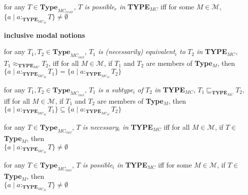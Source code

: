 \begin{shaded}
\begin{ex}
\begin{subex}
\item for any $T\in\textbf{Type}_{\mathit{MC}_{\mathit{restr}}}$, $T$ \textit{is possible$_r$ in} {\bf TYPE$_{\mathit{MC}}$}  iff for some
  $M\in\mathcal{M}$, \\ $\{a\mid a:_{\mathbf{TYPE}_{\mathit{MC}_M}}T\}\not=\emptyset$
 
\end{subex}

\end{ex}

\begin{ex}
\textbf{inclusive modal notions}
\begin{subex} 
 
\item for any $T_1,T_2\in\textbf{Type}_{\mathit{MC}_{\mathit{incl}}}$, $T_1$ \textit{is
    (necessarily) equivalent$_i$
    to} $T_2$ \textit{in} {\bf TYPE$_{\mathit{MC}}$},
  $T_1\approx_{\mathbf{TYPE_{\mathit{MC}}}}T_2$,  iff for all
  $M\in\mathcal{M}$, if $T_1$ and $T_2$ are members of
  \textbf{Type}$_M$, then $\{a\mid a:_{\mathbf{TYPE}_{\mathit{MC}_M}}T_1\}=\{a\mid a:_{\mathbf{TYPE}_{\mathit{MC}_M}}T_2\}$
  
 
\item for any $T_1,T_2\in\textbf{Type}_{\mathit{MC}_{\mathit{incl}}}$, $T_1$ \textit{is a subtype$_i$ of} $T_2$ \textit{in} {\bf TYPE$_{\mathit{MC}}$},
  $T_1\sqsubseteq_{\mathbf{TYPE_{\mathit{MC}}}}T_2$,  iff for all
  $M\in\mathcal{M}$, if $T_1$ and $T_2$ are members of
  \textbf{Type}$_M$, then $\{a\mid a:_{\mathbf{TYPE}_{\mathit{MC}_M}}T_1\}\subseteq\{a\mid a:_{\mathbf{TYPE}_{\mathit{MC}_M}}T_2\}$

\item for any $T\in\textbf{Type}_{\mathit{MC}_{\mathit{incl}}}$, $T$ \textit{is necessary$_i$ in} {\bf TYPE$_{\mathit{MC}}$}  iff for all
  $M\in\mathcal{M}$, if $T\in$\textbf{Type}$_M$, then \\ $\{a\mid a:_{\mathbf{TYPE}_{\mathit{MC}_M}}T\}\not=\emptyset$

\item for any $T\in\textbf{Type}_{\mathit{MC}_{\mathit{incl}}}$, $T$ \textit{is possible$_i$ in} {\bf TYPE$_{\mathit{MC}}$}  iff for some
  $M\in\mathcal{M}$, if $T\in$\textbf{Type}$_M$, then\\ $\{a\mid a:_{\mathbf{TYPE}_{\mathit{MC}_M}}T\}\not=\emptyset$
 
\end{subex} 
\label{ex:inclusive-modal-notions}
\end{ex} 


\end{shaded}
